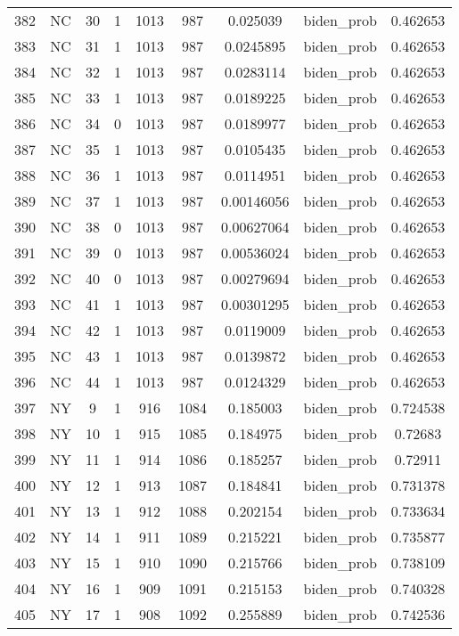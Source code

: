 \documentclass[12pt,a4paper]{article}
\begin{document}
\begin{tabular}{r|cccccccc}
	382 & NC & 30 & 1 & 1013 & 987 & 0.025039 & biden\_prob & 0.462653 \\
	383 & NC & 31 & 1 & 1013 & 987 & 0.0245895 & biden\_prob & 0.462653 \\
	384 & NC & 32 & 1 & 1013 & 987 & 0.0283114 & biden\_prob & 0.462653 \\
	385 & NC & 33 & 1 & 1013 & 987 & 0.0189225 & biden\_prob & 0.462653 \\
	386 & NC & 34 & 0 & 1013 & 987 & 0.0189977 & biden\_prob & 0.462653 \\
	387 & NC & 35 & 1 & 1013 & 987 & 0.0105435 & biden\_prob & 0.462653 \\
	388 & NC & 36 & 1 & 1013 & 987 & 0.0114951 & biden\_prob & 0.462653 \\
	389 & NC & 37 & 1 & 1013 & 987 & 0.00146056 & biden\_prob & 0.462653 \\
	390 & NC & 38 & 0 & 1013 & 987 & 0.00627064 & biden\_prob & 0.462653 \\
	391 & NC & 39 & 0 & 1013 & 987 & 0.00536024 & biden\_prob & 0.462653 \\
	392 & NC & 40 & 0 & 1013 & 987 & 0.00279694 & biden\_prob & 0.462653 \\
	393 & NC & 41 & 1 & 1013 & 987 & 0.00301295 & biden\_prob & 0.462653 \\
	394 & NC & 42 & 1 & 1013 & 987 & 0.0119009 & biden\_prob & 0.462653 \\
	395 & NC & 43 & 1 & 1013 & 987 & 0.0139872 & biden\_prob & 0.462653 \\
	396 & NC & 44 & 1 & 1013 & 987 & 0.0124329 & biden\_prob & 0.462653 \\
	397 & NY & 9 & 1 & 916 & 1084 & 0.185003 & biden\_prob & 0.724538 \\
	398 & NY & 10 & 1 & 915 & 1085 & 0.184975 & biden\_prob & 0.72683 \\
	399 & NY & 11 & 1 & 914 & 1086 & 0.185257 & biden\_prob & 0.72911 \\
	400 & NY & 12 & 1 & 913 & 1087 & 0.184841 & biden\_prob & 0.731378 \\
	401 & NY & 13 & 1 & 912 & 1088 & 0.202154 & biden\_prob & 0.733634 \\
	402 & NY & 14 & 1 & 911 & 1089 & 0.215221 & biden\_prob & 0.735877 \\
	403 & NY & 15 & 1 & 910 & 1090 & 0.215766 & biden\_prob & 0.738109 \\
	404 & NY & 16 & 1 & 909 & 1091 & 0.215153 & biden\_prob & 0.740328 \\
	405 & NY & 17 & 1 & 908 & 1092 & 0.255889 & biden\_prob & 0.742536 \\

\end{tabular}
\end{document}
